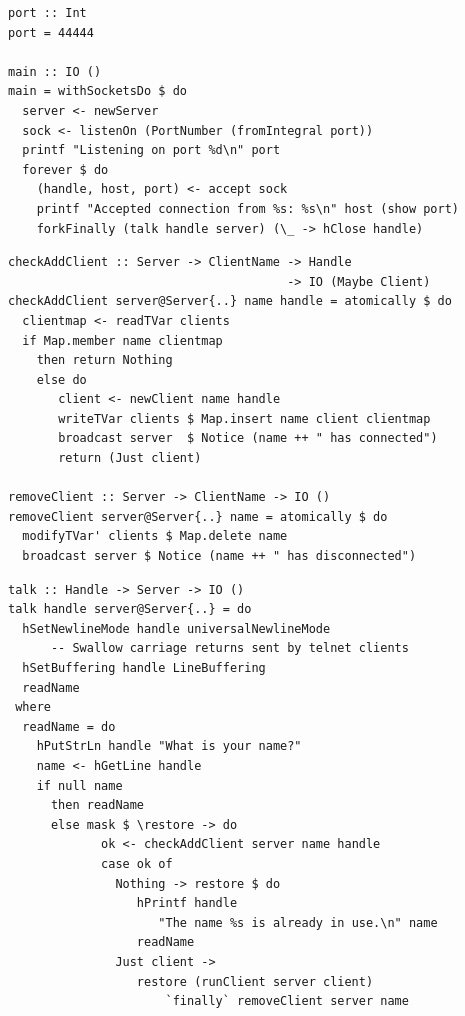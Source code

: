 \documentclass{beamer}
\begin{document}

\begin{frame}[fragile]

\begin{verbatim}
port :: Int
port = 44444

main :: IO ()
main = withSocketsDo $ do
  server <- newServer
  sock <- listenOn (PortNumber (fromIntegral port))
  printf "Listening on port %d\n" port
  forever $ do
    (handle, host, port) <- accept sock
    printf "Accepted connection from %s: %s\n" host (show port)
    forkFinally (talk handle server) (\_ -> hClose handle)
\end{verbatim}

\end{frame}


\begin{frame}[fragile]

\begin{verbatim}
checkAddClient :: Server -> ClientName -> Handle
                                       -> IO (Maybe Client)
checkAddClient server@Server{..} name handle = atomically $ do
  clientmap <- readTVar clients
  if Map.member name clientmap
    then return Nothing
    else do 
       client <- newClient name handle
       writeTVar clients $ Map.insert name client clientmap
       broadcast server  $ Notice (name ++ " has connected")
       return (Just client)
            
removeClient :: Server -> ClientName -> IO ()
removeClient server@Server{..} name = atomically $ do
  modifyTVar' clients $ Map.delete name
  broadcast server $ Notice (name ++ " has disconnected")
\end{verbatim}

\end{frame}


\begin{frame}[fragile]

\begin{verbatim}
talk :: Handle -> Server -> IO ()
talk handle server@Server{..} = do
  hSetNewlineMode handle universalNewlineMode
      -- Swallow carriage returns sent by telnet clients
  hSetBuffering handle LineBuffering
  readName
 where
  readName = do
    hPutStrLn handle "What is your name?"
    name <- hGetLine handle
    if null name
      then readName
      else mask $ \restore -> do
             ok <- checkAddClient server name handle
             case ok of
               Nothing -> restore $ do
                  hPrintf handle
                     "The name %s is already in use.\n" name
                  readName
               Just client ->
                  restore (runClient server client)
                      `finally` removeClient server name
\end{verbatim}

\end{frame}
\end{document}
